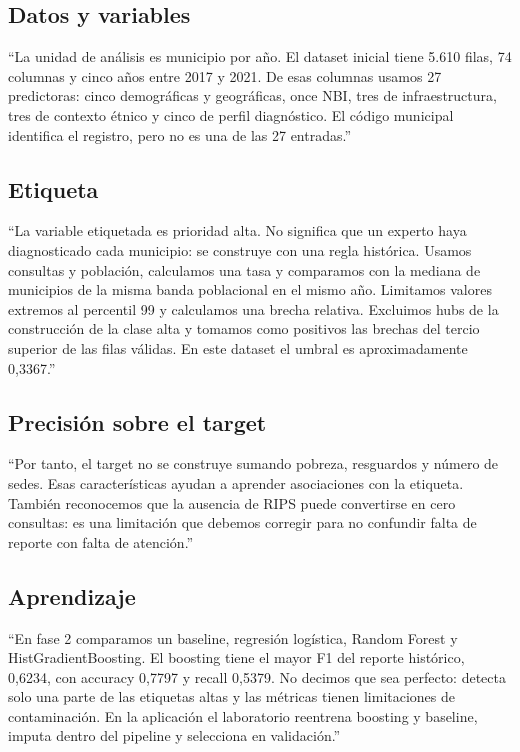 \documentclass[11pt,a4paper]{report}
\begin{document}
\subsection*{Datos y variables}
``La unidad de análisis es municipio por año. El dataset inicial tiene 5.610 filas, 74 columnas y cinco años entre 2017 y 2021. De esas columnas usamos 27 predictoras: cinco demográficas y geográficas, once NBI, tres de infraestructura, tres de contexto étnico y cinco de perfil diagnóstico. El código municipal identifica el registro, pero no es una de las 27 entradas.''

\subsection*{Etiqueta}
``La variable etiquetada es prioridad alta. No significa que un experto haya diagnosticado cada municipio: se construye con una regla histórica. Usamos consultas y población, calculamos una tasa y comparamos con la mediana de municipios de la misma banda poblacional en el mismo año. Limitamos valores extremos al percentil 99 y calculamos una brecha relativa. Excluimos hubs de la construcción de la clase alta y tomamos como positivos las brechas del tercio superior de las filas válidas. En este dataset el umbral es aproximadamente 0,3367.''

\subsection*{Precisión sobre el target}
``Por tanto, el target no se construye sumando pobreza, resguardos y número de sedes. Esas características ayudan a aprender asociaciones con la etiqueta. También reconocemos que la ausencia de RIPS puede convertirse en cero consultas: es una limitación que debemos corregir para no confundir falta de reporte con falta de atención.''

\subsection*{Aprendizaje}
``En fase 2 comparamos un baseline, regresión logística, Random Forest y HistGradientBoosting. El boosting tiene el mayor F1 del reporte histórico, 0,6234, con accuracy 0,7797 y recall 0,5379. No decimos que sea perfecto: detecta solo una parte de las etiquetas altas y las métricas tienen limitaciones de contaminación. En la aplicación el laboratorio reentrena boosting y baseline, imputa dentro del pipeline y selecciona en validación.''
\end{document}
